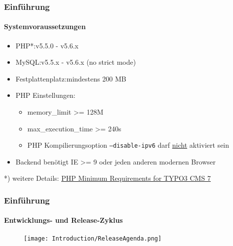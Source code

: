 
\begin{frame}[fragile]
	\frametitle{Einführung}
	\framesubtitle{Systemvoraussetzungen}

	\begin{itemize}
		\item PHP*:\tabto{3cm}v5.5.0 - v5.6.x
		\item MySQL:\tabto{3cm}v5.5.x - v5.6.x (no strict mode)
		\item Festplattenplatz:\tabto{3cm}mindestens 200 MB
		\item PHP Einstellungen:

			\begin{itemize}
				\item memory\_limit >= 128M
				\item max\_execution\_time >= 240s
				\item PHP Kompilierungsoption \texttt{--disable-ipv6} darf \underline{nicht} aktiviert sein
			\end{itemize}

		\item Backend benötigt IE >= 9 oder jeden anderen modernen Browser

	\end{itemize}

	\vspace{1cm}
	*) weitere Details: \href{http://typo3.org/news/article/php-minimum-requirements-for-typo3-cms-7/}{PHP Minimum Requirements for TYPO3 CMS 7}

\end{frame}


\begin{frame}[fragile]
	\frametitle{Einführung}
	\framesubtitle{Entwicklungs- und Release-Zyklus}

	\begin{figure}
		\texttt{[image: Introduction/ReleaseAgenda.png]}
	\end{figure}

\end{frame}

